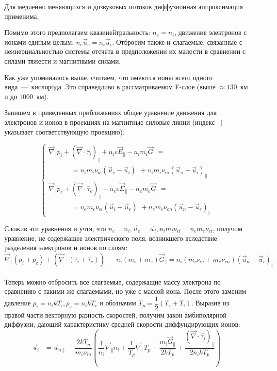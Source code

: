 \documentclass[14pt, a4paper, fleqn]{extarticle}
\begin{document}
Для медленно меняющихся и дозвуковых потоков диффузионная аппроксимация применима.

\bigskip

Помимо этого предполагаем квазинейтральность: $n_e=n_i$, движение электронов с ионами единым целым: $n_e \vec{u}_e=n_i \vec{u}_i$. Отбросим также и слагаемые, связанные с неинерциальностью системы отсчета в предположении их малости в сравнении с силами тяжести и магнитными силами.

Как уже упоминалось выше, считаем, что имеются ионы всего одного вида~---~кислорода. Это справедливо в рассматриваемом F-слое (выше $\approx 130$~км и до $1000$~км).

Запишем в приведенных приближениях общее уравнение движения для электронов и ионов в проекциях на магнитные силовые линии (индекс $\parallel$ указывает соответствующую проекцию):

$$\begin{cases}
\vec{\nabla}_\parallel p_i + (\vec{\nabla}\cdot \hat{\tau}_i)_\parallel + n_ie\vec{E}_\parallel-n_im_i\vec{G}_\parallel=\\
\textrm{ }\textrm{ }\textrm{ }\textrm{ }\textrm{ }=n_im_i\nu_{ie}(\vec{u}_e-\vec{u}_i)_\parallel+n_im_i\nu_{in}(\vec{u}_n-\vec{u}_i)_\parallel\\
\vec{\nabla}_\parallel p_e + (\vec{\nabla}\cdot \hat{\tau}_e)_\parallel - n_ee\vec{E}_\parallel-n_em_e\vec{G}_\parallel=\\
\textrm{ }\textrm{ }\textrm{ }\textrm{ }\textrm{ }=n_em_e\nu_{ei}(\vec{u}_i-\vec{u}_e)_\parallel+n_em_e\nu_{en}(\vec{u}_n-\vec{u}_e)_\parallel
\end{cases}$$

Сложив эти уравнения и учтя, что $n_e=n_i, \vec{u}_e=\vec{u}_i, n_im_i\nu_{ei}=n_em_e\nu_{ei}$, получим уравнение, не содержащее электрического поля, возникшего вследствие разделения электронов и ионов по слоям:
$$\vec{\nabla}_\parallel (p_i+p_e) + (\vec{\nabla}\cdot (\hat{\tau}_i+\hat{\tau}_e))_\parallel-n_i(m_i+m_e)\vec{G}_\parallel=n_i(m_i\nu_{in}+m_e\nu_{en})(\vec{u}_n-\vec{u}_i)_\parallel$$

Теперь можно отбросить все слагаемые, содержащие массу электрона по сравнению с такими же слагаемыми, но уже с массой иона. После этого заменим давление $p_i=n_ikT_i, p_e=n_ikT_e$ и обозначим $T_p=\dfrac{1}{2}(T_e+T_i)$. Выразив из правой части векторную разность скоростей, получим закон амбиполярной диффузии, дающий характеристику средней скорости диффундирующих ионов: 
$$\vec{u}_{i\parallel} = \vec{u}_{n\parallel} - \dfrac{2kT_p}{m_i\nu_{in}}\left(\dfrac{1}{n_i}\vec{\nabla}_\parallel n_i+\dfrac{1}{T_p}\vec{\nabla}_\parallel T_p-\dfrac{m_i\vec{G}_\parallel}{2kT_p}+\dfrac{(\vec{\nabla}\cdot\hat{\tau_i})_\parallel}{2n_ikT_p}\right)$$
\end{document}
